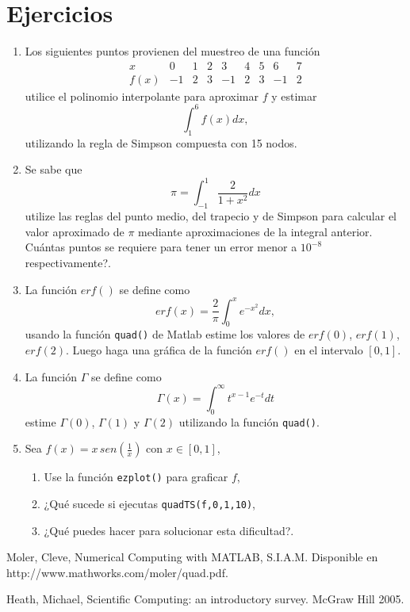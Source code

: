 \documentclass[11pt]{article}
\begin{document}
\section{Ejercicios}
\begin{enumerate}
\item Los siguientes puntos provienen del muestreo de una funci\'on
$$
\begin{array}{c|cccccccc}
x 		& 0  & 1 & 2 & 3 & 4 & 5 & 6 & 7 \\
\hline
f(x)	& -1 & 2 & 3 & -1 & 2 & 3 & -1 & 2 
\end{array}
$$
utilice el polinomio interpolante para aproximar $f$ y estimar 
$$
\int_1^6 f(x) dx,
$$
utilizando la regla de Simpson compuesta con 15 nodos.

\item Se sabe que 
$$
\pi=\int_{-1}^1\frac{2}{1+x^2}dx
$$
utilize las reglas del punto medio, del trapecio y de Simpson para calcular el valor aproximado de $\pi$ mediante aproximaciones de la integral anterior. \textquestiondown Cu\'antas puntos se requiere para tener un error menor a $10^{-8}$ respectivamente?.

\item La funci\'on $erf()$ se define como
$$
erf(x)=\frac{2}{\pi}\int_0^xe^{-x^2}dx,
$$
usando la funci\'on \texttt{quad()} de Matlab estime los valores de $erf(0)$, $erf(1)$, $erf(2)$. Luego haga una gr\'afica de la funci\'on $erf()$ en el intervalo $[0,1]$.

\item La funci\'on $\Gamma$ se define como
$$
\Gamma(x)=\int_0^\infty t^{x-1}e^{-t}dt
$$
estime $\Gamma(0)$, $\Gamma(1)$ y $\Gamma(2)$ utilizando la funci\'on \texttt{quad()}.

\item Sea $f(x)=x\,sen\left(\frac{1}{x}\right)$ con $x\in[0,1]$,
\begin{enumerate}
	\item Use la funci\'on \texttt{ezplot()} para graficar $f$,
    \item ¿Qu\'e sucede si ejecutas \texttt{quadTS(f,0,1,10)},
    \item ¿Qu\'e puedes hacer para solucionar esta dificultad?.
\end{enumerate}
\end{enumerate}





\begin{thebibliography}{9}
 Moler, Cleve, Numerical Computing with MATLAB, S.I.A.M. Disponible en http://www.mathworks.com/moler/quad.pdf.

 Heath, Michael, Scientific Computing: an introductory survey. McGraw Hill 2005.



\end{thebibliography}
\end{document}

